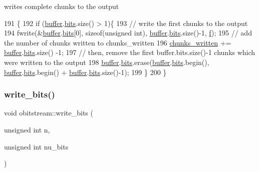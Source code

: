 writes complete chunks to the output 


\begin{DoxyCode}
191                       \{
192   \textcolor{keywordflow}{if} (\hyperlink{classobitstream_aeaccad00a395a404aa16472bfa052be3}{buffer}.\hyperlink{classbit__pipe_a86f38af1e9736b053728033490476b50}{bits}.size() > 1)\{
193     \textcolor{comment}{// write the first chunks to the output}
194     fwrite(&\hyperlink{classobitstream_aeaccad00a395a404aa16472bfa052be3}{buffer}.\hyperlink{classbit__pipe_a86f38af1e9736b053728033490476b50}{bits}[0], \textcolor{keyword}{sizeof}(\textcolor{keywordtype}{unsigned} \textcolor{keywordtype}{int}), \hyperlink{classobitstream_aeaccad00a395a404aa16472bfa052be3}{buffer}.\hyperlink{classbit__pipe_a86f38af1e9736b053728033490476b50}{bits}.size()-1, 
      \hyperlink{classobitstream_ac589d74745217748c888ae777ab324a7}{f});
195     \textcolor{comment}{// add the number of chunks written to chunks\_written}
196     \hyperlink{classobitstream_a3022397f2b6133ea5990016d9d078a2f}{chunks\_written} += \hyperlink{classobitstream_aeaccad00a395a404aa16472bfa052be3}{buffer}.\hyperlink{classbit__pipe_a86f38af1e9736b053728033490476b50}{bits}.size() -1;
197     \textcolor{comment}{// then, remove the first buffer.bits.size()-1 chunks which were written to the output}
198     \hyperlink{classobitstream_aeaccad00a395a404aa16472bfa052be3}{buffer}.\hyperlink{classbit__pipe_a86f38af1e9736b053728033490476b50}{bits}.erase(\hyperlink{classobitstream_aeaccad00a395a404aa16472bfa052be3}{buffer}.\hyperlink{classbit__pipe_a86f38af1e9736b053728033490476b50}{bits}.begin(), \hyperlink{classobitstream_aeaccad00a395a404aa16472bfa052be3}{buffer}.\hyperlink{classbit__pipe_a86f38af1e9736b053728033490476b50}{bits}.begin() + 
      \hyperlink{classobitstream_aeaccad00a395a404aa16472bfa052be3}{buffer}.\hyperlink{classbit__pipe_a86f38af1e9736b053728033490476b50}{bits}.size()-1); 
199   \}
200 \}
\end{DoxyCode}
\mbox{\label{classobitstream_afb0cc2fb4f739881436d887bd4770355}} 
\subsubsection{\texorpdfstring{write\+\_\+bits()}{write\_bits()}}
{\footnotesize\ttfamily void obitstream\+::write\+\_\+bits (\begin{DoxyParamCaption}\item[{unsigned int}]{n,  }\item[{unsigned int}]{nu\+\_\+bits }\end{DoxyParamCaption})}



